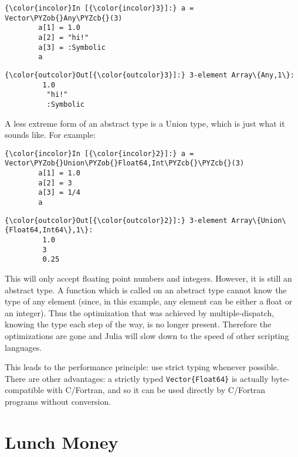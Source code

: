 \documentclass[11pt]{article}
\def\PYZob{\char`\{}
\def\PYZcb{\char`\}}
\begin{document}
    \begin{Verbatim}[commandchars=\\\{\}]
{\color{incolor}In [{\color{incolor}3}]:} a = Vector\PYZob{}Any\PYZcb{}(3)
        a[1] = 1.0
        a[2] = "hi!"
        a[3] = :Symbolic
        a
\end{Verbatim}

            \begin{Verbatim}[commandchars=\\\{\}]
{\color{outcolor}Out[{\color{outcolor}3}]:} 3-element Array\{Any,1\}:
         1.0       
          "hi!"    
          :Symbolic
\end{Verbatim}
        
    A less extreme form of an abstract type is a Union type, which is just
what it sounds like. For example:

    \begin{Verbatim}[commandchars=\\\{\}]
{\color{incolor}In [{\color{incolor}2}]:} a = Vector\PYZob{}Union\PYZob{}Float64,Int\PYZcb{}\PYZcb{}(3)
        a[1] = 1.0
        a[2] = 3
        a[3] = 1/4
        a
\end{Verbatim}

            \begin{Verbatim}[commandchars=\\\{\}]
{\color{outcolor}Out[{\color{outcolor}2}]:} 3-element Array\{Union\{Float64,Int64\},1\}:
         1.0 
         3   
         0.25
\end{Verbatim}
        
    This will only accept floating point numbers and integers. However, it
is still an abstract type. A function which is called on an abstract
type cannot know the type of any element (since, in this example, any
element can be either a float or an integer). Thus the optimization that
was achieved by multiple-dispatch, knowing the type each step of the
way, is no longer present. Therefore the optimizations are gone and
Julia will slow down to the speed of other scripting languages.

This leads to the performance principle: use strict typing whenever
possible. There are other advantages: a strictly typed
\texttt{Vector\{Float64\}} is actually byte-compatible with C/Fortran,
and so it can be used directly by C/Fortran programs without conversion.

    \section{Lunch Money}\label{lunch-money}
\end{document}
